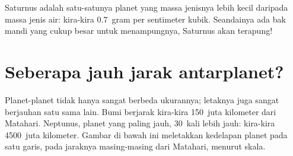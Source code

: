 \begin{remark}\label{rem:g6:earth-a-planet:saturn}
Saturnus adalah satu-satunya planet yang massa jenisnya lebih kecil daripada
massa jenis air: kira-kira 0.7~gram per sentimeter kubik. Seandainya ada
bak mandi yang cukup besar untuk menampungnya, Saturnus akan terapung!
\end{remark}

\section{Seberapa jauh jarak antarplanet?}

Planet-planet tidak hanya sangat berbeda ukurannya; letaknya juga sangat
berjauhan satu sama lain. Bumi berjarak kira-kira 150~juta kilometer dari
Matahari. Neptunus, planet yang paling jauh, 30~kali lebih jauh: kira-kira
4500~juta kilometer. Gambar di bawah ini meletakkan kedelapan planet pada
satu garis, pada jaraknya masing-masing dari Matahari, menurut skala.

